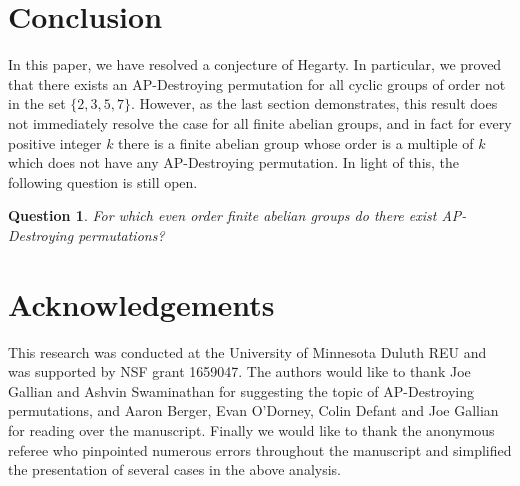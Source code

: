 \documentclass[12pt]{amsart}
\newtheorem{prob}[thm]{Question}
\theoremstyle{definition}
\theoremstyle{remark}
\begin{document}
\section{Conclusion}
In this paper, we have resolved a conjecture of Hegarty. In particular, we proved that there exists an AP-Destroying permutation for all cyclic groups of order not in the set $\{2, 3, 5, 7\}$. However, as the last section demonstrates, this result does not immediately resolve the case for all finite abelian groups, and in fact for every positive integer $k$ there is a finite abelian group whose order is a multiple of $k$ which does not have any AP-Destroying permutation. In light of this, the following question is still open.
\begin{prob}
For which even order finite abelian groups do there exist AP-Destroying permutations?
\end{prob}
\section{Acknowledgements}
This research was conducted at the University of Minnesota Duluth REU and was supported by NSF grant 1659047. The authors would like to thank Joe Gallian and Ashvin Swaminathan for suggesting the topic of AP-Destroying permutations, and Aaron Berger, Evan O'Dorney, Colin Defant and Joe Gallian for reading over the manuscript. Finally we would like to thank the anonymous referee who pinpointed numerous errors throughout the manuscript and simplified the presentation of several cases in the above analysis.




\end{document}
